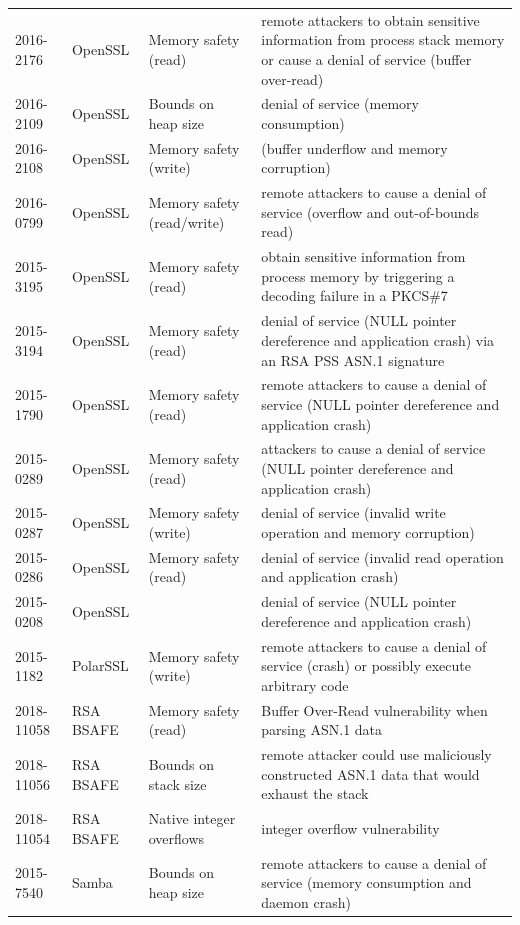 \documentclass[10p,conference]{IEEEtran}
\begin{document}
\begin{longtable}{ l l l p{26em} }
2016-2176    & OpenSSL       & Memory safety (read) & remote attackers to obtain sensitive information from process stack memory or cause a denial of service (buffer over-read) \\ 
2016-2109    & OpenSSL       & Bounds on heap size & denial of service (memory consumption) \\ 
2016-2108    & OpenSSL       & Memory safety (write) & (buffer underflow and memory corruption) \\ 
2016-0799    & OpenSSL       & Memory safety (read/write) & remote attackers to cause a denial of service (overflow and out-of-bounds read) \\ 
2015-3195    & OpenSSL       & Memory safety (read) & obtain sensitive information from process memory by triggering a decoding failure in a PKCS\#7 \\ 
2015-3194    & OpenSSL       & Memory safety (read) & denial of service (NULL pointer dereference and application crash) via an RSA PSS ASN.1 signature \\ 
2015-1790    & OpenSSL       & Memory safety (read) & remote attackers to cause a denial of service (NULL pointer dereference and application crash) \\ 
2015-0289    & OpenSSL       & Memory safety (read) & attackers to cause a denial of service (NULL pointer dereference and application crash) \\ 
2015-0287    & OpenSSL       & Memory safety (write) & denial of service (invalid write operation and memory corruption) \\ 
2015-0286    & OpenSSL       & Memory safety (read) & denial of service (invalid read operation and application crash) \\ 
2015-0208    & OpenSSL       & & denial of service (NULL pointer dereference and application crash) \\ 
2015-1182    & PolarSSL      & Memory safety (write) & remote attackers to cause a denial of service (crash) or possibly execute arbitrary code \\ 
2018-11058   & RSA BSAFE     & Memory safety (read) & Buffer Over-Read vulnerability when parsing ASN.1 data \\ 
2018-11056   & RSA BSAFE     & Bounds on stack size & remote attacker could use maliciously constructed ASN.1 data that would exhaust the stack \\ 
2018-11054   & RSA BSAFE     & Native integer overflows & integer overflow vulnerability \\ 
2015-7540    & Samba         & Bounds on heap size & remote attackers to cause a denial of service (memory consumption and daemon crash) \\ 

\end{longtable}
\end{document}
